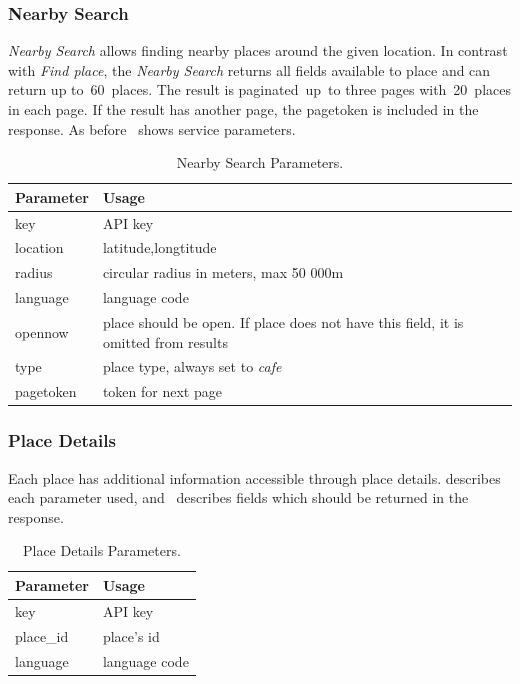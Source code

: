 \subsubsection{Nearby Search}
\textit{Nearby Search} allows finding nearby places around the given location. In contrast with \textit{Find place}, the \textit{Nearby Search} returns all fields available to place and can return up to~60~places. The result is paginated~up~to three pages with~20~places in each page. If the result has another page, the pagetoken is included in the response. As before~ shows service parameters.

\begin{table}[htbp]
\centering
\begin{tabularx}{\textwidth}{|l|X|}
\hline
\textbf{Parameter} & \textbf{Usage} \\ \hline
key                & API key \\ \hline
location           & latitude,longtitude \\ \hline
radius             & circular radius in meters, max 50 000m  \\ \hline
language           & language code \\ \hline
opennow         & place should be open. If place does not have this field, it is omitted from results  \\ \hline
type & place type, always set to \textit{cafe} \\ \hline
pagetoken & token for next page \\ \hline 
\end{tabularx}
\caption{Nearby Search Parameters.}
\label{table:gapi-nearby-search-parameters}
\end{table}
\subsubsection{Place Details}
Each place has additional information accessible through place details.  describes each parameter used, and~ describes fields which should be returned in the response.

\begin{table}[htbp]
\centering
\begin{tabularx}{\textwidth}{|l|X|}
\hline
\textbf{Parameter} & \textbf{Usage} \\ \hline
key                & API key \\ \hline
place\_id           & place's id \\ \hline
language           & language code \\ \hline
\end{tabularx}
\caption{Place Details Parameters.}
\label{table:gapi-details-parameters}
\end{table}

